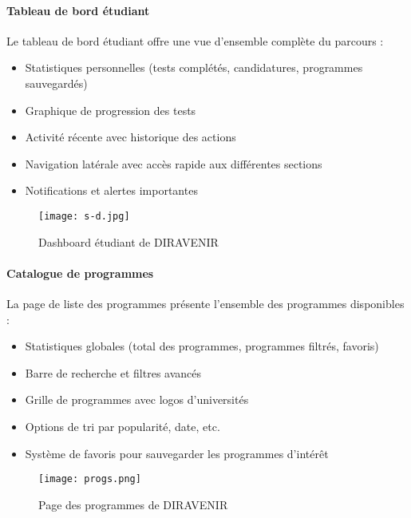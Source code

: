 \documentclass[12pt,a4paper]{report}
\begin{document}
\paragraph{Tableau de bord étudiant}

Le tableau de bord étudiant offre une vue d'ensemble complète du parcours :

\begin{itemize}
    \item Statistiques personnelles (tests complétés, candidatures, programmes sauvegardés)
    \item Graphique de progression des tests
    \item Activité récente avec historique des actions
    \item Navigation latérale avec accès rapide aux différentes sections
    \item Notifications et alertes importantes
\end{itemize}

\begin{figure}[H]
\centering
\texttt{[image: s-d.jpg]}
\caption{Dashboard étudiant de DIRAVENIR}
\label{fig:student-dashboard}
\end{figure}

\paragraph{Catalogue de programmes}

La page de liste des programmes présente l'ensemble des programmes disponibles :

\begin{itemize}
    \item Statistiques globales (total des programmes, programmes filtrés, favoris)
    \item Barre de recherche et filtres avancés
    \item Grille de programmes avec logos d'universités
    \item Options de tri par popularité, date, etc.
    \item Système de favoris pour sauvegarder les programmes d'intérêt
\end{itemize}

\begin{figure}[H]
\centering
\texttt{[image: progs.png]}
\caption{Page des programmes de DIRAVENIR}
\label{fig:programs-page}
\end{figure}
\end{document}
